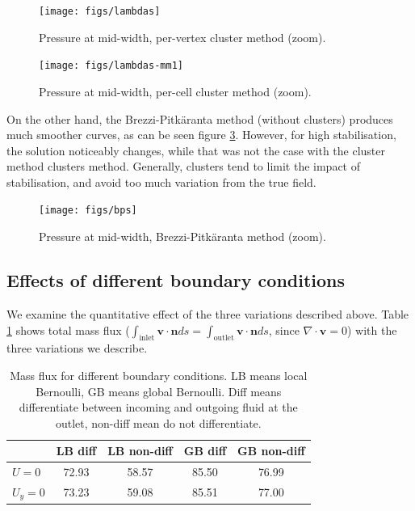 \documentclass[12pt]{article}
\newcommand{\vb}[1]{\ensuremath{\boldsymbol #1}}
\begin{document}
\begin{figure}[h!]
\centering
\texttt{[image: figs/lambdas]}
\caption{Pressure at mid-width, per-vertex cluster method (zoom).}
\label{fig:lambdas}
\end{figure}


\begin{figure}[h!]
\centering
\texttt{[image: figs/lambdas-mm1]}
\caption{Pressure at mid-width, per-cell cluster method (zoom).}
\label{fig:lambdas-mm1}
\end{figure}

On the other hand, the Brezzi-Pitk\"aranta method (without clusters)
produces much smoother curves, as can be seen figure
\ref{fig:bps}. However, for high stabilisation, the solution
noticeably changes, while that was not the case with the cluster
method clusters method. Generally, clusters tend to limit the impact
of stabilisation, and avoid too much variation from the true field.

\begin{figure}[h!]
\centering
\texttt{[image: figs/bps]}
\caption{Pressure at mid-width, Brezzi-Pitk\"aranta method (zoom).}
\label{fig:bps}
\end{figure}
\subsection{Effects of different boundary conditions}
\label{effect-bc}
We examine the quantitative effect of the three variations described
above. Table \ref{table:debits} shows total mass flux
($\int_{\text{inlet}} \vb{v} \cdot \vb{n} ds = \int_{\text{outlet}}
\vb{v} \cdot \vb{n} ds$, since $\nabla \cdot \vb v = 0$) with the
three variations we describe.


\begin{table}[!h]
  \centering
  \begin{tabular}{|l|c|c|c|c|}
    \hline
    & LB diff & LB non-diff & GB diff & GB non-diff \\
    \hline
    $U = 0$ & 72.93 & 58.57 & 85.50 & 76.99\\
    $U_y = 0$ & 73.23 & 59.08 & 85.51 & 77.00 \\
    \hline
  \end{tabular}
  \caption[Mass flux for different boundary conditions]{
    Mass flux for different boundary conditions. LB means local
    Bernoulli, GB means global Bernoulli. Diff means differentiate
    between incoming and outgoing fluid at the outlet, non-diff mean do
    not differentiate.}
  \label{table:debits}
\end{table}
\end{document}
